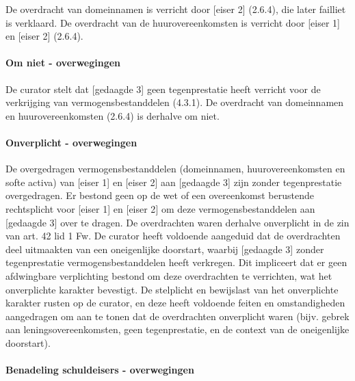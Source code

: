 \documentclass[
  dutch,
  a4paper,
]{article}
\begin{document}
De overdracht van domeinnamen is verricht door {[}eiser 2{]} (2.6.4), die later failliet is verklaard. De overdracht van de huurovereenkomsten is verricht door {[}eiser 1{]} en {[}eiser 2{]} (2.6.4).

\paragraph{Om niet - overwegingen}\label{om-niet---overwegingen-18}

De curator stelt dat {[}gedaagde 3{]} geen tegenprestatie heeft verricht voor de verkrijging van vermogensbestanddelen (4.3.1). De overdracht van domeinnamen en huurovereenkomsten (2.6.4) is derhalve om niet.

\paragraph{Onverplicht - overwegingen}\label{onverplicht---overwegingen-18}

De overgedragen vermogensbestanddelen (domeinnamen, huurovereenkomsten en softe activa) van {[}eiser 1{]} en {[}eiser 2{]} aan {[}gedaagde 3{]} zijn zonder tegenprestatie overgedragen. Er bestond geen op de wet of een overeenkomst berustende rechtsplicht voor {[}eiser 1{]} en {[}eiser 2{]} om deze vermogensbestanddelen aan {[}gedaagde 3{]} over te dragen. De overdrachten waren derhalve onverplicht in de zin van art. 42 lid 1 Fw. De curator heeft voldoende aangeduid dat de overdrachten deel uitmaakten van een oneigenlijke doorstart, waarbij {[}gedaagde 3{]} zonder tegenprestatie vermogensbestanddelen heeft verkregen. Dit impliceert dat er geen afdwingbare verplichting bestond om deze overdrachten te verrichten, wat het onverplichte karakter bevestigt. De stelplicht en bewijslast van het onverplichte karakter rusten op de curator, en deze heeft voldoende feiten en omstandigheden aangedragen om aan te tonen dat de overdrachten onverplicht waren (bijv. gebrek aan leningsovereenkomsten, geen tegenprestatie, en de context van de oneigenlijke doorstart).

\paragraph{Benadeling schuldeisers - overwegingen}\label{benadeling-schuldeisers---overwegingen-18}
\end{document}
